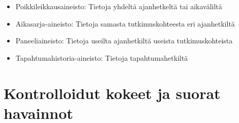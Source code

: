 \documentclass[
]{book}
\providecommand{\tightlist}{%
  \setlength{\itemsep}{0pt}\setlength{\parskip}{0pt}}
\begin{document}
\begin{itemize}
  \begin{itemize}
  \tightlist
  \item
    Poikkileikkausaineisto: Tietoja yhdeltä ajanhetkeltä tai aikaväliltä
  \item
    Aikasarja-aineisto: Tietoja samasta tutkimuskohteesta eri ajanhetkiltä
  \item
    Paneeliaineisto: Tietoja useilta ajanhetkiltä useista tutkimuskohteista
  \item
    Tapahtumahistoria-aineisto: Tietoja tapahtumahetkiltä
  \end{itemize}
\end{itemize}

\hypertarget{alaluku54}{%
\section{Kontrolloidut kokeet ja suorat havainnot}\label{alaluku54}}
\end{document}
